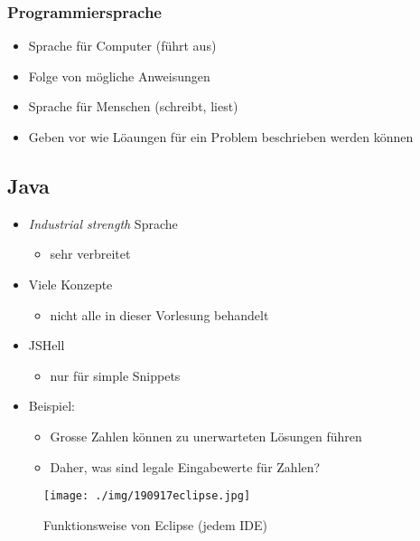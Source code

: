 \documentclass[11pt]{article}
\begin{document}
\subsubsection{Programmiersprache}
\label{sec:org88d716e}
\begin{itemize}
\item Sprache für Computer (führt aus)\\
\item Folge von mögliche Anweisungen\\
\item Sprache für Menschen (schreibt, liest)\\
\item Geben vor wie Löaungen für ein Problem beschrieben werden können\\
\end{itemize}

\subsection{Java}
\label{sec:orgb2bb9fc}
\begin{itemize}
\item \emph{Industrial strength} Sprache\\
\begin{itemize}
\item sehr verbreitet\\
\end{itemize}
\item Viele Konzepte\\
\begin{itemize}
\item nicht alle in dieser Vorlesung behandelt\\
\end{itemize}
\item JSHell\\
\begin{itemize}
\item nur für simple Snippets\\
\end{itemize}
\item Beispiel:\\
\begin{itemize}
\item Grosse Zahlen können zu unerwarteten Lösungen führen\\
\item Daher, was sind legale Eingabewerte für Zahlen?\\
\end{itemize}
\end{itemize}
\begin{figure}[htbp]
\centering
\texttt{[image: ./img/190917eclipse.jpg]}
\caption{Funktionsweise von Eclipse (jedem IDE)}
\end{figure}
\end{document}

